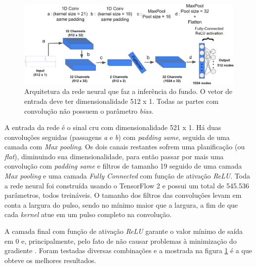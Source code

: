\documentclass[a4paper,12pt,oneside]{book}
\begin{document}

\begin{figure}[H]
    \centering
    \includegraphics[scale = 0.28]{figs/Source to only bkg.png}
    \caption{Arquitetura da rede neural que faz a inferência do fundo. O vetor de entrada deve ter dimensionalidade 512 x 1. Todas as partes com convolução não possuem o parâmetro \textit{bias}.}
    \label{fig:arq_source_to_bkg}
\end{figure}

\par A entrada da rede é o sinal cru com dimensionalidade 521 x 1. Há duas convoluções seguidas (passagens \textit{a} e \textit{b}) com \textit{padding same}, seguida de uma camada com \textit{Max pooling}. Os dois canais restantes sofrem uma planificação (ou \textit{flat}), diminuindo sua dimensionalidade, para então passar por mais uma convolução com \textit{padding same} e filtros de tamanho 19 seguido de uma camada \textit{Max pooling} e uma camada \textit{Fully Connected} com função de ativação \textit{ReLU}. Toda a rede neural foi construída usando o TensorFlow 2 e possui um total de 545.536 parâmetros, todos treináveis. O tamanho dos filtros das convoluções levam em conta a largura do pulso, sendo no mínimo maior que a largura, a fim de que cada \textit{kernel} atue em um pulso completo na convolução\cite{FORTINO2022166497}.

\par A camada final com função de ativação \textit{ReLU} garante o valor mínimo de saída em 0 e, principalmente, pelo fato de não causar problemas à minimização do gradiente \cite{VGP}. Foram testadas diversas combinações e a mostrada na figura \ref{fig:arq_source_to_bkg} é a que obteve os melhores resultados\cite{FORTINO2022166497}. 
\end{document}
